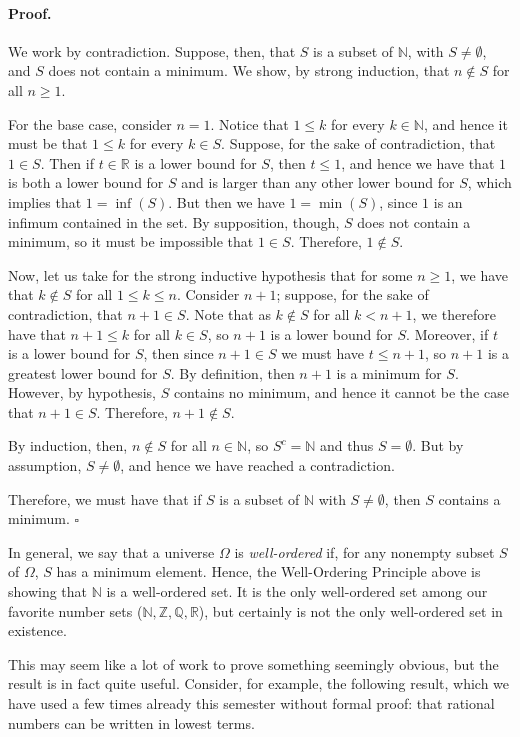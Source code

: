 \documentclass{article}
\theoremstyle{definition}
\renewenvironment{proof} {\paragraph{Proof.}}{\hfill$\square$}
\newcommand{\Z}{\mathbb{Z}}
\newcommand{\N}{\mathbb{N}}
\newcommand{\Q}{\mathbb{Q}}
\newcommand{\R}{\mathbb{R}}
\begin{document}
\begin{proof}
We work by contradiction. Suppose, then, that $S$ is a subset of $\N$, with $S\neq \emptyset$, and $S$ does not contain a minimum. We show, by strong induction, that $n\notin S$ for all $n\geq 1$.

For the base case, consider $n=1$. Notice that $1\leq k$ for every $k\in\N$, and hence it must be that $1\leq k$ for every $k\in S$. Suppose, for the sake of contradiction, that $1\in S$. Then if $t\in \R$ is a lower bound for $S$, then $t\leq 1$, and hence we have that $1$ is both a lower bound for $S$ and is larger than any other lower bound for $S$, which implies that $1=\inf(S)$. But then we have $1=\min(S)$, since $1$ is an infimum contained in the set. By supposition, though, $S$ does not contain a minimum, so it must be impossible that $1\in S$. Therefore, $1\notin S$. 

Now, let us take for the strong inductive hypothesis that for some $n\geq 1$, we have that $k\notin S$ for all $1\leq k\leq n$. Consider $n+1$; suppose, for the sake of contradiction, that $n+1\in S$. Note that as $k\notin S$ for all $k<n+1$, we therefore have that $n+1\leq k$ for all $k\in S$, so $n+1$ is a lower bound for $S$. Moreover, if $t$ is a lower bound for $S$, then since $n+1\in S$ we must have $t\leq n+1$, so $n+1$ is a greatest lower bound for $S$. By definition, then $n+1$ is a minimum for $S$. However, by hypothesis, $S$ contains no minimum, and hence it cannot be the case that $n+1\in S$. Therefore, $n+1\notin S$.

By induction, then, $n\notin S$ for all $n\in\N$, so $S^c = \N$ and thus $S=\emptyset$. But by assumption, $S\neq \emptyset$, and hence we have reached a contradiction. 

Therefore, we must have that if $S$ is a subset of $\N$ with $S\neq \emptyset$, then $S$ contains a minimum.
\end{proof}

In general, we say that a universe $\Omega$ is {\it well-ordered} if, for any nonempty subset $S$ of $\Omega$, $S$ has a minimum element. Hence, the Well-Ordering Principle above is showing that $\N$ is a well-ordered set. It is the only well-ordered set among our favorite number sets ($\N, \Z, \Q, \R$), but certainly is not the only well-ordered set in existence.

This may seem like a lot of work to prove something seemingly obvious, but the result is in fact quite useful. Consider, for example, the following result, which we have used a few times already this semester without formal proof: that rational numbers can be written in lowest terms.
\end{document}
